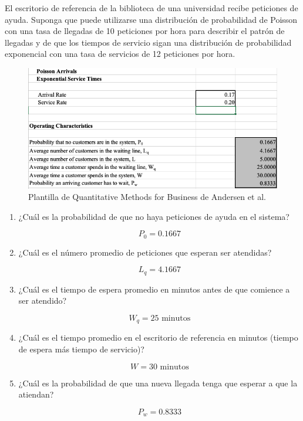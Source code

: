 \begin{problema}
	El escritorio de referencia de la biblioteca de una universidad recibe peticiones de ayuda. Suponga que puede utilizarse una distribución de probabilidad de Poisson con una tasa de llegadas de 10 peticiones por hora para describir el patrón de llegadas y de que los tiempos de servicio sigan una distribución de probabilidad exponencial con una tasa de servicios de 12 peticiones por hora.
	\begin{figure}[H]
		\centering
		\includegraphics[scale=0.5]{Images/5}
		\caption{Plantilla de Quantitative Methods for Business de Andersen et al. }
	\end{figure}
	\begin{enumerate}
		\item ¿Cuál es la probabilidad de que no haya peticiones de ayuda en el sistema?
		\begin{dem}
			$$P_0=0.1667$$
		\end{dem}
		\item ¿Cuál es el número promedio de peticiones que esperan ser atendidas?
		\begin{dem}
			$$L_q= 4.1667$$
		\end{dem}
		\item ¿Cuál es el tiempo de espera promedio en minutos antes de que comience a ser atendido?
		\begin{dem}
			$$W_q = 25 \text{ minutos}$$
		\end{dem}
		\item ¿Cuál es el tiempo promedio en el escritorio de referencia en minutos (tiempo de espera más tiempo de servicio)?
		\begin{dem}
			$$W= 30 \text{ minutos}$$
		\end{dem}
		\item ¿Cuál es la probabilidad de que una nueva llegada tenga que esperar a que la atiendan?
		\begin{dem}
			$$P_w = 0.8333$$
		\end{dem}
	\end{enumerate}
\end{problema}

%
%

